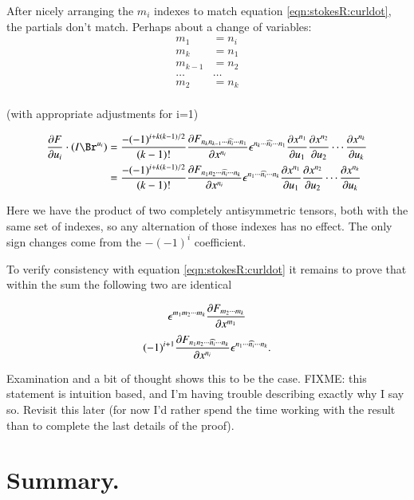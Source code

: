 After nicely arranging the $m_i$ indexes to match equation \ref{eqn:stokesR:curldot}, the partials don't match.  Perhaps about a change of variables:
\begin{align*}
m_1 &= n_i \\
m_k &= n_1 \\
m_{k-1} &= n_2 \\
\hdots & \hdots \\
m_2 &= n_k \\
\end{align*}

(with appropriate adjustments for i=1)

\begin{align*}
\PD{u_i}{F} \cdot (I \Br^{u_i})
&=
\frac{-(-1)^{i + k(k-1)/2}}{(k-1)!}
\PD{x^{n_i}}{F_{n_k n_{k-1} \cdots \widehat{n_i} \cdots n_{1}}}
\epsilon^{n_k \cdots \widehat{n_i} \cdots n_{1}} 
\PD{u_1}{x^{n_1}} \PD{u_2}{x^{n_2}} \cdots \PD{u_k}{x^{n_k}} \\
&=
\frac{-(-1)^{i + k(k-1)/2}}{(k-1)!}
\PD{x^{n_i}}{F_{n_1 n_{2} \cdots \widehat{n_i} \cdots n_{k}}}
\epsilon^{n_1 \cdots \widehat{n_i} \cdots n_{k}} 
\PD{u_1}{x^{n_1}} \PD{u_2}{x^{n_2}} \cdots \PD{u_k}{x^{n_k}} \\
\end{align*}

Here we have the product of two completely antisymmetric tensors, both with the same set of indexes, so any alternation of those indexes has
no effect.  The only sign changes come from the $-(-1)^i$ coefficient.

To verify consistency with equation \ref{eqn:stokesR:curldot} it remains 
to prove that within the sum the following two are identical

\begin{align}\label{eqn:stokesR:p1}
\epsilon^{m_1 m_2 \cdots m_k} \PD{x^{m_{1}}}{F_{m_2 \cdots m_{k}}}
\end{align}
\begin{align}\label{eqn:stokesR:p2}
(-1)^{i+1}
\PD{x^{n_i}}{F_{n_1 n_{2} \cdots \widehat{n_i} \cdots n_{k}}}
\epsilon^{n_1 \cdots \widehat{n_i} \cdots n_{k}}.
\end{align}

Examination and a bit of thought shows this to be the case.
FIXME: this statement is intuition based, and I'm having trouble describing
exactly why I say so.  Revisit this later (for now I'd rather spend the time
working with the result than to complete the last details of the proof).

\section{Summary. }

